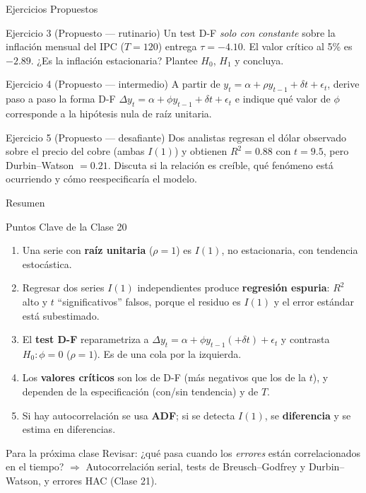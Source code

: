 \documentclass{beamer}
\begin{document}
\begin{frame}{Ejercicios Propuestos}

\begin{block}{Ejercicio 3 (Propuesto --- rutinario)}
Un test D-F \emph{solo con constante} sobre la inflación mensual del IPC ($T=120$) entrega $\tau=-4.10$. El valor crítico al 5\% es $-2.89$. ¿Es la inflación estacionaria? Plantee $H_0$, $H_1$ y concluya.
\end{block}

\begin{block}{Ejercicio 4 (Propuesto --- intermedio)}
A partir de $y_t=\alpha+\rho y_{t-1}+\delta t+\epsilon_t$, derive paso a paso la forma D-F $\Delta y_t=\alpha+\phi y_{t-1}+\delta t+\epsilon_t$ e indique qué valor de $\phi$ corresponde a la hipótesis nula de raíz unitaria.
\end{block}

\begin{block}{Ejercicio 5 (Propuesto --- desafiante)}
Dos analistas regresan el dólar observado sobre el precio del cobre (ambas $I(1)$) y obtienen $R^2=0.88$ con $t=9.5$, pero Durbin--Watson $=0.21$. Discuta si la relación es creíble, qué fenómeno está ocurriendo y cómo reespecificaría el modelo.
\end{block}

\end{frame}

\begin{frame}{Resumen}

\begin{block}{Puntos Clave de la Clase 20}
\begin{enumerate}
    \item Una serie con \textbf{raíz unitaria} ($\rho=1$) es $I(1)$, no estacionaria, con tendencia estocástica.
    \item Regresar dos series $I(1)$ independientes produce \textbf{regresión espuria}: $R^2$ alto y $t$ ``significativos'' falsos, porque el residuo es $I(1)$ y el error estándar está subestimado.
    \item El \textbf{test D-F} reparametriza a $\Delta y_t=\alpha+\phi y_{t-1}(+\delta t)+\epsilon_t$ y contrasta $H_0:\phi=0$ ($\rho=1$). Es de una cola por la izquierda.
    \item Los \textbf{valores críticos} son los de D-F (más negativos que los de la $t$), y dependen de la especificación (con/sin tendencia) y de $T$.
    \item Si hay autocorrelación se usa \textbf{ADF}; si se detecta $I(1)$, se \textbf{diferencia} y se estima en diferencias.
\end{enumerate}
\end{block}

\begin{alertblock}{Para la próxima clase}
Revisar: ¿qué pasa cuando los \emph{errores} están correlacionados en el tiempo? $\Rightarrow$ Autocorrelación serial, tests de Breusch--Godfrey y Durbin--Watson, y errores HAC (Clase 21).
\end{alertblock}

\end{frame}
\end{document}
